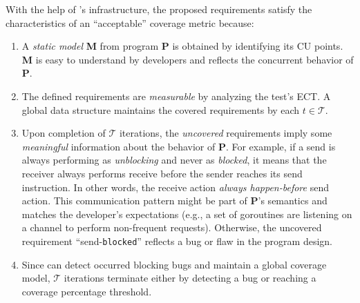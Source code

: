 %
With the help of \goat's infrastructure, the proposed requirements satisfy the characteristics of an ``acceptable'' coverage metric because:
\begin{enumerate}
  \item A \textit{static model} \textbf{M} from program \textbf{P} is obtained by identifying its CU points. \textbf{M} is easy to understand by developers and reflects the concurrent behavior of \textbf{P}.
  \item The defined requirements are \textit{measurable} by analyzing the test's ECT. A global data structure maintains the covered requirements by each $t \in \mathcal{T}$.
  \item Upon completion of $\mathcal{T}$ iterations, the \textit{uncovered} requirements imply some \textit{meaningful} information about the behavior of \textbf{P}. For example, if a send is always performing as \textit{unblocking} and never as \textit{blocked}, it means that the receiver always performs receive before the sender reaches its send instruction. In other words, the receive action \textit{always happen-before} send action. This communication pattern might be part of \textbf{P}'s semantics and matches the developer's expectations (e.g., a set of goroutines are listening on a channel to perform non-frequent requests). Otherwise, the uncovered requirement  ``send-\texttt{blocked}'' reflects a bug or flaw in the program design.
  \item Since \goat can detect occurred blocking bugs and maintain a global coverage model, $\mathcal{T}$ iterations terminate either by detecting a bug or reaching a coverage percentage threshold.
\end{enumerate}

